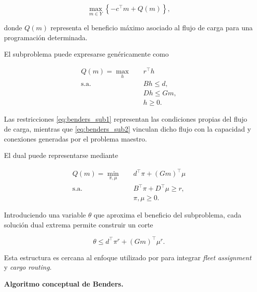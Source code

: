 \begin{equation}
\max_{m\in Y}
\left\{
-c^\top m+Q(m)
\right\},
\label{eq:benders_outer}
\end{equation}

donde $Q(m)$ representa el beneficio máximo asociado al flujo de carga para una programación
determinada.

El subproblema puede expresarse genéricamente como

\begin{align}
Q(m)=\max_h\quad
& r^\top h
\label{eq:benders_sub_obj}
\\
\text{s.a.}\quad
& Bh\leq d,
\label{eq:benders_sub1}
\\
& Dh\leq Gm,
\label{eq:benders_sub2}
\\
& h\geq0.
\label{eq:benders_sub3}
\end{align}

Las restricciones \eqref{eq:benders_sub1} representan las condiciones propias del flujo de
carga, mientras que \eqref{eq:benders_sub2} vinculan dicho flujo con la capacidad y conexiones
generadas por el problema maestro.

El dual puede representarse mediante

\begin{align}
Q(m)=\min_{\pi,\mu}\quad
& d^\top\pi+(Gm)^\top\mu
\label{eq:benders_dual_obj}
\\
\text{s.a.}\quad
& B^\top\pi+D^\top\mu\geq r,
\label{eq:benders_dual_cons}
\\
& \pi,\mu\geq0.
\end{align}

Introduciendo una variable $\theta$ que aproxima el beneficio del subproblema, cada solución
dual extrema permite construir un corte

\begin{equation}
\theta
\leq
d^\top\pi^r
+
(Gm)^\top\mu^r.
\label{eq:benders_cut}
\end{equation}

Esta estructura es cercana al enfoque utilizado por  para integrar
\textit{fleet assignment} y \textit{cargo routing}.


\vspace{0.5em}
\noindent\textbf{Algoritmo conceptual de Benders.}

